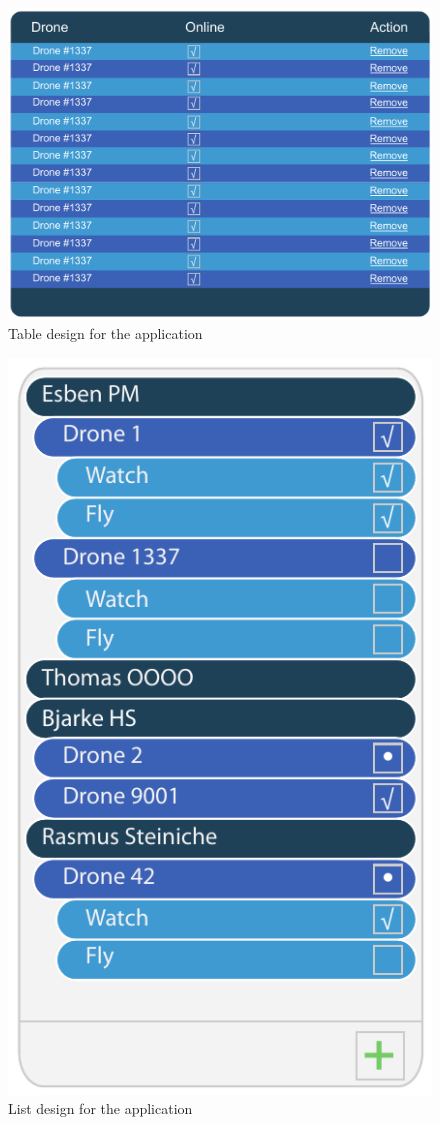 \begin{figure}[htb]
    \centering
    \includegraphics[width=\textwidth]{gfx/table.pdf}
    \caption{Table design for the application}
    \label{fig:table_design}
\end{figure}

\begin{figure}[htb]
    \centering
    \includegraphics[scale=1.0]{gfx/list.pdf}
    \caption{List design for the application}
    \label{fig:list_design}
\end{figure}

